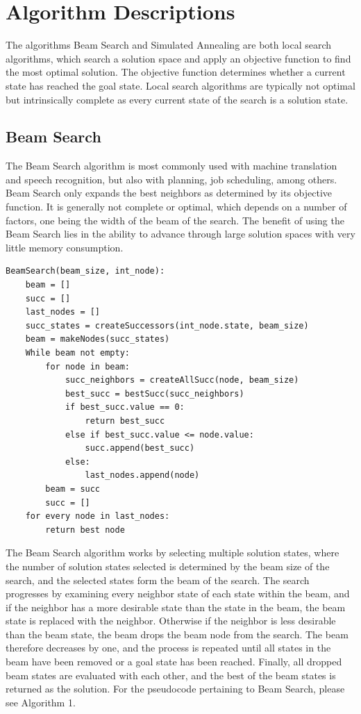 \documentclass[10pt, twocolumn]{article}
\begin{document}
\section{Algorithm Descriptions}

The algorithms Beam Search and Simulated Annealing are both local search algorithms, which search a solution space and apply an objective function to find the most optimal solution. The objective function determines whether a current state has reached the goal state. Local search algorithms are typically not optimal but intrinsically complete as every current state of the search is a solution state.



\subsection{Beam Search}

The Beam Search algorithm is most commonly used with machine translation and speech recognition, but also with planning, job scheduling, among others\cite{alves}. Beam Search only expands the best neighbors as determined by its objective function. It is generally not complete or optimal, which depends on a number of factors, one being the width of the beam of the search\cite{hansen}. The benefit of using the Beam Search lies in the ability to advance through large solution spaces with very little memory consumption.

\begin{lstlisting}[caption={ Beam Search}]
BeamSearch(beam_size, int_node):
    beam = []
    succ = []
    last_nodes = []
    succ_states = createSuccessors(int_node.state, beam_size)
    beam = makeNodes(succ_states)
    While beam not empty:
        for node in beam:
            succ_neighbors = createAllSucc(node, beam_size)
            best_succ = bestSucc(succ_neighbors)
            if best_succ.value == 0:
                return best_succ
            else if best_succ.value <= node.value:
                succ.append(best_succ)
            else:
                last_nodes.append(node)
        beam = succ
        succ = []
    for every node in last_nodes:
        return best node
\end{lstlisting}

The Beam Search algorithm works by selecting multiple solution states, where the number of solution states selected is determined by the beam size of the search, and the selected states form the beam of the search. The search progresses by examining every neighbor state of each state within the beam, and if the neighbor has a more desirable state than the state in the beam, the beam state is replaced with the neighbor. Otherwise if the neighbor is less desirable than the beam state, the beam drops the beam node from the search. The beam therefore decreases by one, and the process is repeated until all states in the beam have been removed or a goal state has been reached. Finally, all dropped beam states are evaluated with each other, and the best of the beam states is returned as the solution. For the pseudocode pertaining to Beam Search, please see Algorithm 1.
\end{document}
